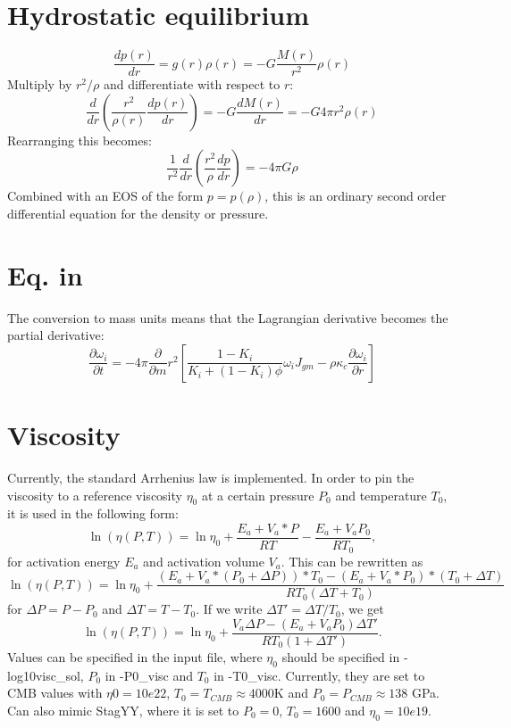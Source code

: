 \documentclass[12pt,notitlepage]{article}
\begin{document}
\section{Hydrostatic equilibrium}
\label{sect:hydrostatic}
\begin{equation}
\frac{dp(r)}{dr} = g(r) \rho(r) = -G \frac{M(r)}{r^2}\rho(r)
\end{equation}
Multiply by $r^2/\rho$ and differentiate with respect to $r$:
\begin{equation}
\frac{d}{dr} \left( \frac{r^2}{\rho(r)} \frac{dp(r)}{dr} \right) = -G \frac{dM(r)}{dr} = -G 4 \pi r^2 \rho(r)
\end{equation}
Rearranging this becomes:
\begin{equation}
\frac{1}{r^2} \frac{d}{dr} \left( \frac{r^2}{\rho}\frac{dp}{dr} \right) = -4 \pi G \rho
\end{equation}
Combined with an EOS of the form $p=p(\rho)$, this is an ordinary second order differential equation for the density or pressure.
\section{Eq. in \cite{ABE93}}
The conversion to mass units means that the Lagrangian derivative becomes the partial derivative:
\begin{equation}
\frac{\partial \omega_i}{\partial t} = -4 \pi \frac{\partial}{\partial m} r^2 \left[ \frac{1-K_i}{K_i+(1-K_i)\phi} \omega_i J_{gm} - \rho \kappa_c \frac{\partial \omega_i}{\partial r} \right]
\end{equation}

\section{Viscosity}
Currently, the standard Arrhenius law is implemented. In order to pin the viscosity to a reference viscosity $\eta_0$ at a certain pressure $P_0$ and temperature $T_0$, it is used in the following form:
\begin{equation}
\ln ( \eta (P,T)) = \ln \eta_0 + \frac{E_a + V_a*P}{RT} - \frac{E_a + V_a P_0}{R T_0},
\end{equation}
for activation energy $E_a$ and activation volume $V_a$. This can be rewritten as
\begin{equation*}
\ln ( \eta (P,T)) = \ln \eta_0 + \frac{(E_a + V_a*(P_0 + \Delta P))*T_0 - (E_a + V_a*P_0)*(T_0 + \Delta T)}{R T_0 (\Delta T + T_0)}
\end{equation*}
for $\Delta P = P - P_0$ and $\Delta T = T - T_0$. If we write $\Delta T' = \Delta T/T_0$, we get
\begin{equation}
\ln ( \eta (P,T)) = \ln \eta_0 + \frac{V_a \Delta P - (E_a + V_a P_0)\Delta T'}{R T_0 (1 + \Delta T')}.
\end{equation}
Values can be specified in the input file, where $\eta_0$ should be specified in -log10visc\_sol, $P_0$ in -P0\_visc and $T_0$ in -T0\_visc. Currently, they are set to CMB values with $\eta0 = 10e22$, $T_0 = T_{CMB} \approx 4000$K and $P_0 = P_{CMB} \approx 138$ GPa. Can also mimic StagYY, where it is set to $P_0 = 0$, $T_0 = 1600$ and $\eta_0 = 10e19$.
\end{document}
